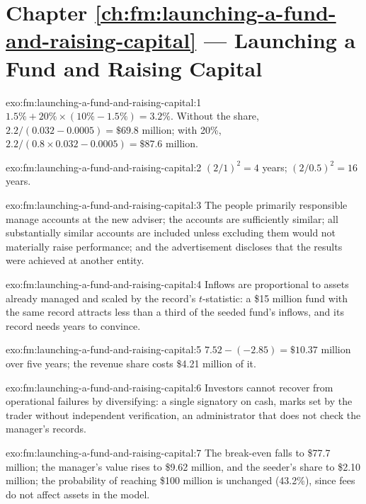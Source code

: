 \section*{Chapter \ref{ch:fm:launching-a-fund-and-raising-capital} --- Launching a Fund and Raising Capital}

\begin{solution}{exo:fm:launching-a-fund-and-raising-capital:1}
$1.5\%+20\%\times(10\%-1.5\%)=3.2\%$. Without the share, $2.2/(0.032-0.0005)=\$69.8$ million; with 20\%, $2.2/(0.8\times0.032-0.0005)=\$87.6$ million.
\end{solution}

\begin{solution}{exo:fm:launching-a-fund-and-raising-capital:2}
$(2/1)^2=4$ years; $(2/0.5)^2=16$ years.
\end{solution}

\begin{solution}{exo:fm:launching-a-fund-and-raising-capital:3}
The people primarily responsible manage accounts at the new adviser; the accounts are sufficiently similar; all substantially similar accounts are
included unless excluding them would not materially raise performance; and the advertisement discloses that the results were achieved at another
entity.
\end{solution}

\begin{solution}{exo:fm:launching-a-fund-and-raising-capital:4}
Inflows are proportional to assets already managed and scaled by the record's $t$-statistic: a \$15 million fund with the same record attracts less
than a third of the seeded fund's inflows, and its record needs years to convince.
\end{solution}

\begin{solution}{exo:fm:launching-a-fund-and-raising-capital:5}
$7.52-(-2.85)=\$10.37$ million over five years; the revenue share costs \$4.21 million of it.
\end{solution}

\begin{solution}{exo:fm:launching-a-fund-and-raising-capital:6}
Investors cannot recover from operational failures by diversifying: a single signatory on cash, marks set by the trader without independent
verification, an administrator that does not check the manager's records.
\end{solution}

\begin{solution}{exo:fm:launching-a-fund-and-raising-capital:7}
The break-even falls to \$77.7 million; the manager's value rises to \$9.62 million, and the seeder's share to \$2.10 million; the probability of
reaching \$100 million is unchanged (43.2\%), since fees do not affect assets in the model.
\end{solution}

